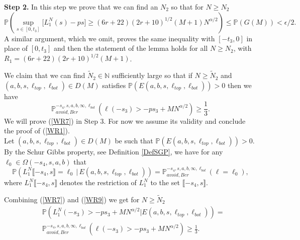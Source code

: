 {\raggedleft \bf Step 2.} In this step we prove that  we can find an $N_2$ so that for $N \geq N_2$
\begin{equation}\label{WR1}
	\mathbb{P}\left( \sup_{s \in [0,t_3] }\big[ L^N_1(s) - p s \big] \geq  (6r+22)(2r+10)^{1/2}(M+1)N^{\alpha/2} \right) \leq \mathbb{P}(G(M)) < \epsilon/2.
\end{equation}
A similar argument, which we omit, proves the same inequality with $[-t_3,0]$ in place of $[0,t_3]$ and then the statement of the lemma holds for all $N\geq N_2$, with $R_1 = (6r+22)(2r+10)^{1/2}(M+1)$.

We claim that we can find $\tilde{N}_2 \in \mathbb{N}$ sufficiently large so that if $N \geq \tilde{N}_2$ and $(a,b,s,\ell_{top},\ell_{bot})\in D(M)$ satisfies $\mathbb{P}( E(a,b,s,\ell_{top},\ell_{bot})) > 0$ then we have
\begin{equation}\label{WR7}
	\mathbb{P}^{-s_4,s,a,b,\infty,\ell_{bot}}_{avoid, Ber}\left(\ell(-s_3) > -ps_3 + MN^{\alpha/2}\right) \geq \frac{1}{3}.
\end{equation}
We will prove (\ref{WR7}) in Step 3. For now we assume its validity and conclude the proof of (\ref{WR1}).\\

Let $(a,b,s,\ell_{top},\ell_{bot})\in D(M)$ be such that $\mathbb{P}( E(a,b,s,\ell_{top},\ell_{bot})) > 0$. By the Schur Gibbs property, see Definition \ref{DefSGP}, we have for any $\ell_0\in\Omega(-s_4,s,a,b)$ that
\begin{equation}\label{WR9}
	\mathbb{P}\left(L_1^N\llbracket -s_4,s \rrbracket = \ell_0\,|\,E(a,b,s,\ell_{top}, \ell_{bot}) \right) = \mathbb{P}^{-s_4,s,a,b,\infty,\ell_{bot}}_{avoid, Ber}(\ell = \ell_0),
\end{equation}
where $L_1^N\llbracket -s_4,s \rrbracket$ denotes the restriction of $L_1^N$ to the set $\llbracket -s_4,s \rrbracket$.

Combining (\ref{WR7}) and (\ref{WR9}) we get for $N \geq \tilde{N}_2$
\begin{equation}\label{WR10}
	\begin{split}
		&\mathbb{P}\left( L_1^N(-s_3) > -ps_3 + MN^{\alpha/2} \vert E(a,b,s, \ell_{top}, \ell_{bot})\right) = \\
		&\mathbb{P}^{-s_4,s,a,b,\infty,\ell_{bot}}_{avoid, Ber}\left(\ell(-s_3) > -ps_3 + MN^{\alpha/2}\right) \geq \frac{1}{3}.
	\end{split}
\end{equation}

